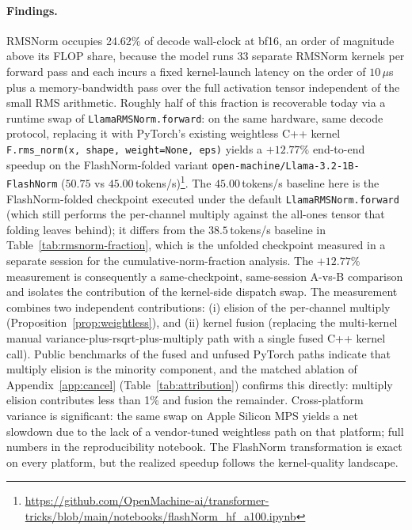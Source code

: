 \documentclass{article}
\begin{document}
\paragraph{Findings.} RMSNorm occupies 24.62\% of decode wall-clock at bf16, an order of magnitude above its FLOP share, because the model runs 33 separate RMSNorm kernels per forward pass and each incurs a fixed kernel-launch latency on the order of $10\,\mu$s plus a memory-bandwidth pass over the full activation tensor independent of the small RMS arithmetic. Roughly half of this fraction is recoverable today via a runtime swap of \texttt{LlamaRMSNorm.forward}: on the same hardware, same decode protocol, replacing it with PyTorch's existing weightless C++ kernel \texttt{F.rms\_norm(x, shape, weight=None, eps)} yields a $\mathbf{+12.77\%}$ end-to-end speedup on the FlashNorm-folded variant
\texttt{open-machine/Llama-3.2-1B-FlashNorm} ($50.75$ vs $45.00$\,tokens/s)\footnote{\url{https://github.com/OpenMachine-ai/transformer-tricks/blob/main/notebooks/flashNorm\_hf\_a100.ipynb}}.
The $45.00$\,tokens/s baseline here is the FlashNorm-folded checkpoint executed under the default \texttt{LlamaRMSNorm.forward} (which still performs the per-channel multiply against the all-ones tensor that folding leaves behind); it differs from the $38.5$\,tokens/s baseline in Table~\ref{tab:rmsnorm-fraction}, which is the unfolded checkpoint measured in a separate session for the cumulative-norm-fraction analysis. The $+12.77\%$ measurement is consequently a same-checkpoint, same-session A-vs-B comparison and isolates the contribution of the kernel-side dispatch swap. The measurement combines two independent contributions: (i) elision of the per-channel multiply (Proposition~\ref{prop:weightless}), and (ii) kernel fusion (replacing the multi-kernel manual variance-plus-rsqrt-plus-multiply path with a single fused C++ kernel call). Public benchmarks of the fused and unfused PyTorch paths indicate that multiply elision is the minority component, and the matched ablation of Appendix~\ref{app:cancel} (Table~\ref{tab:attribution}) confirms this directly: multiply elision contributes less than 1\% and fusion the remainder. Cross-platform variance is significant: the same swap on Apple Silicon MPS yields a net slowdown due to the lack of a vendor-tuned weightless path on that platform; full numbers in the reproducibility notebook. The FlashNorm transformation is exact on every platform, but the realized speedup follows the kernel-quality landscape.
\end{document}
